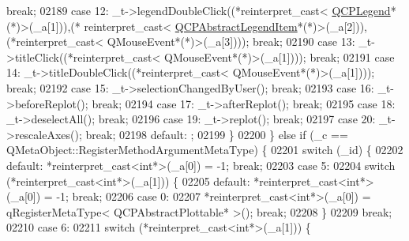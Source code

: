 \begin{DoxyCode}
{      break};
02189         \textcolor{keywordflow}{case} 12: \_t->legendDoubleClick((*\textcolor{keyword}{reinterpret\_cast<} \hyperlink{a00045}{QCPLegend}*(*)\textcolor{keyword}{>}(\_a[1])),(*\textcolor{keyword}{
      reinterpret\_cast<} \hyperlink{a00023}{QCPAbstractLegendItem}*(*)\textcolor{keyword}{>}(\_a[2])),(*\textcolor{keyword}{reinterpret\_cast<} QMouseEvent*(*)\textcolor{keyword}{>}(\_a[3]))); \textcolor{keywordflow}{
      break};
02190         \textcolor{keywordflow}{case} 13: \_t->titleClick((*\textcolor{keyword}{reinterpret\_cast<} QMouseEvent*(*)\textcolor{keyword}{>}(\_a[1]))); \textcolor{keywordflow}{break};
02191         \textcolor{keywordflow}{case} 14: \_t->titleDoubleClick((*\textcolor{keyword}{reinterpret\_cast<} QMouseEvent*(*)\textcolor{keyword}{>}(\_a[1]))); \textcolor{keywordflow}{break};
02192         \textcolor{keywordflow}{case} 15: \_t->selectionChangedByUser(); \textcolor{keywordflow}{break};
02193         \textcolor{keywordflow}{case} 16: \_t->beforeReplot(); \textcolor{keywordflow}{break};
02194         \textcolor{keywordflow}{case} 17: \_t->afterReplot(); \textcolor{keywordflow}{break};
02195         \textcolor{keywordflow}{case} 18: \_t->deselectAll(); \textcolor{keywordflow}{break};
02196         \textcolor{keywordflow}{case} 19: \_t->replot(); \textcolor{keywordflow}{break};
02197         \textcolor{keywordflow}{case} 20: \_t->rescaleAxes(); \textcolor{keywordflow}{break};
02198         \textcolor{keywordflow}{default}: ;
02199         \}
02200     \} \textcolor{keywordflow}{else} \textcolor{keywordflow}{if} (\_c == QMetaObject::RegisterMethodArgumentMetaType) \{
02201         \textcolor{keywordflow}{switch} (\_id) \{
02202         \textcolor{keywordflow}{default}: *\textcolor{keyword}{reinterpret\_cast<}\textcolor{keywordtype}{int}*\textcolor{keyword}{>}(\_a[0]) = -1; \textcolor{keywordflow}{break};
02203         \textcolor{keywordflow}{case} 5:
02204             \textcolor{keywordflow}{switch} (*reinterpret\_cast<int*>(\_a[1])) \{
02205             \textcolor{keywordflow}{default}: *\textcolor{keyword}{reinterpret\_cast<}\textcolor{keywordtype}{int}*\textcolor{keyword}{>}(\_a[0]) = -1; \textcolor{keywordflow}{break};
02206             \textcolor{keywordflow}{case} 0:
02207                 *\textcolor{keyword}{reinterpret\_cast<}\textcolor{keywordtype}{int}*\textcolor{keyword}{>}(\_a[0]) = qRegisterMetaType< QCPAbstractPlottable* >(); \textcolor{keywordflow}{break};
02208             \}
02209             \textcolor{keywordflow}{break};
02210         \textcolor{keywordflow}{case} 6:
02211             \textcolor{keywordflow}{switch} (*reinterpret\_cast<int*>(\_a[1])) \{

\end{DoxyCode}
